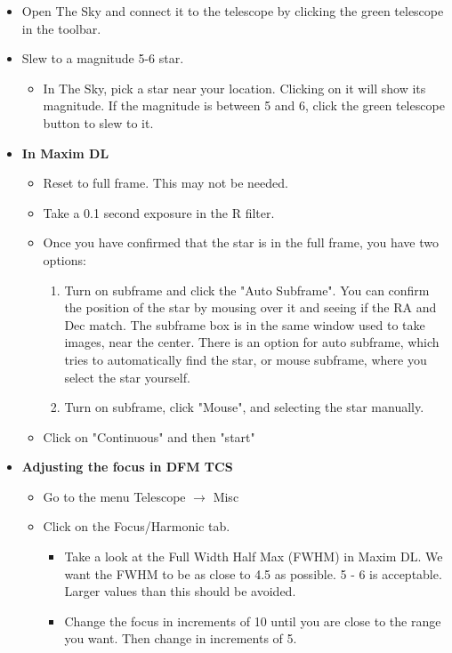 \documentclass[letterpaper, 12pt]{report}
\begin{document}
\begin{itemize}
	\item Open The Sky and connect it to the telescope by clicking the green telescope in the toolbar.
	\item Slew to a magnitude 5-6 star.
	\begin{itemize}
		\item In The Sky, pick a star near your location. Clicking on it will show its magnitude. If the magnitude is between 5 and 6, click the green telescope button to slew to it. 
	\end{itemize}
	\item \large \textbf{In Maxim DL}
	\begin{itemize}
		\item Reset to full frame. This may not be needed.
		\item Take a 0.1 second exposure in the R filter. 
	\end{itemize}
	\begin{itemize}
		\item Once you have confirmed that the star is in the full frame, you have two options:
		\begin{enumerate}
			\item Turn on subframe and click the "Auto Subframe". You can confirm the position of the star by mousing over it and seeing if the RA and Dec match. The subframe box is in the same window used to take images, near the center. There is an option for auto subframe, which tries to automatically find the star, or mouse subframe, where you select the star yourself. 
			\item Turn on subframe, click "Mouse", and selecting the star manually.
		\end{enumerate}
		\item Click on "Continuous" and then "start" 
	\end{itemize}
	\item \large \textbf{Adjusting the focus in DFM TCS}
	\begin{itemize}
		\item Go to the menu Telescope $\rightarrow$ Misc
		\item Click on the Focus/Harmonic tab.
		\begin{itemize}
			\item Take a look at the Full Width Half Max (FWHM) in Maxim DL. We want the FWHM to be as close to 4.5 as possible. 5 - 6 is acceptable. Larger values than this should be avoided.
			\item Change the focus in increments of 10 until you are close to the range you want. Then change in increments of 5.

\end{itemize}
\end{itemize}
\end{itemize}
\end{document}
